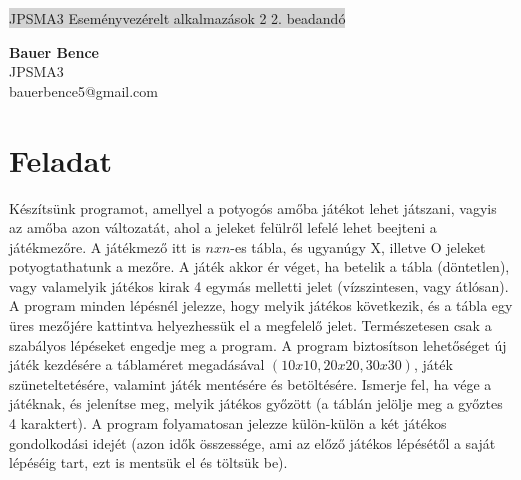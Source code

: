 \documentclass[11pt,a4paper]{article}
\begin{document}
\renewcommand{\labelitemi}{\textbullet}
\def\br{\\[0.1cm]}
\thispagestyle{empty}
\begin{center}
	\colorbox{lightgray}{{\large JPSMA3} \hspace{3cm} {\large Eseményvezérelt alkalmazások 2 2. beadandó} \hspace{5cm} \thepage}
\end{center}
\begin{framed}
	\begin{flushleft}
		{\large \textbf{Bauer Bence}}
		\hspace{5.4cm}{\large 2018.11.10.}\br
		{\large JPSMA3}\br
		{\large bauerbence5@gmail.com}
	\end{flushleft}
\end{framed}
\section{Feladat}
Készítsünk programot, amellyel a potyogós amőba játékot lehet játszani, vagyis
az amőba azon változatát, ahol a jeleket felülről lefelé lehet beejteni a
játékmezőre. A játékmező itt is $nxn$-es tábla, és ugyanúgy X, illetve O jeleket
potyogtathatunk a mezőre. A játék akkor ér véget, ha betelik a tábla (döntetlen),
vagy valamelyik játékos kirak 4 egymás melletti jelet (vízszintesen, vagy átlósan).
A program minden lépésnél jelezze, hogy melyik játékos következik, és a tábla
egy üres mezőjére kattintva helyezhessük el a megfelelő jelet. Természetesen
csak a szabályos lépéseket engedje meg a program.
A program biztosítson lehetőséget új játék kezdésére a táblaméret megadásával
$(10 x 10, 20 x 20, 30 x 30)$, játék szüneteltetésére, valamint játék mentésére és
betöltésére. Ismerje fel, ha vége a játéknak, és jelenítse meg, melyik játékos
győzött (a táblán jelölje meg a győztes 4 karaktert). A program folyamatosan
jelezze külön-külön a két játékos gondolkodási idejét (azon idők összessége, ami
az előző játékos lépésétől a saját lépéséig tart, ezt is mentsük el és töltsük be).
\end{document}
